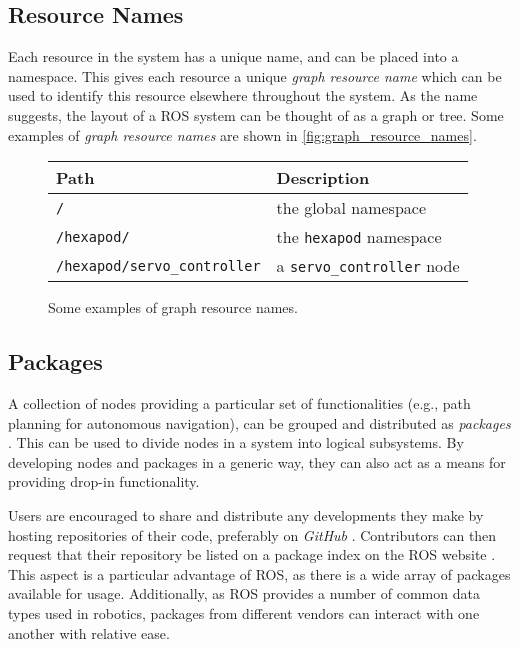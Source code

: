 \subsection{Resource Names}

Each resource in the system has a unique name, and can be placed into a namespace. This gives each resource a unique \emph{graph resource name} which can be used to identify this resource elsewhere throughout the system. As the name suggests, the layout of a ROS system can be thought of as a graph or tree. Some examples of \emph{graph resource names} are shown in \autoref{fig:graph_resource_names}.

\begin{figure}[!h]
    \centering
    \begin{tabular}{  l l  }
        \toprule
        \textbf{Path} & \textbf{Description} \\
        \midrule
        \texttt{/} & the global namespace \\
        \texttt{/hexapod/} & the \texttt{hexapod} namespace \\
        \texttt{/hexapod/servo\_controller} & a \texttt{servo\_controller} node \\
        \bottomrule
    \end{tabular}
    \caption{Some examples of graph resource names.}
    \label{fig:graph_resource_names}
\end{figure}

\subsection{Packages}
A collection of nodes providing a particular set of functionalities (e.g., path planning for autonomous navigation), can be grouped and distributed as \emph{packages} \cite{ros_paper}. This can be used to divide nodes in a system into logical subsystems. By developing nodes and packages in a generic way, they can also act as a means for providing drop-in functionality.

Users are encouraged to share and distribute any developments they make by hosting repositories of their code, preferably on \emph{GitHub} \cite{ros_wiki_getinvolved}. Contributors can then request that their repository be listed on a package index on the ROS website \cite{ros_wiki_getinvolved}. This aspect is a particular advantage of ROS, as there is a wide array of packages available for usage. Additionally, as ROS provides a number of common data types used in robotics, packages from different vendors can interact with one another with relative ease.

